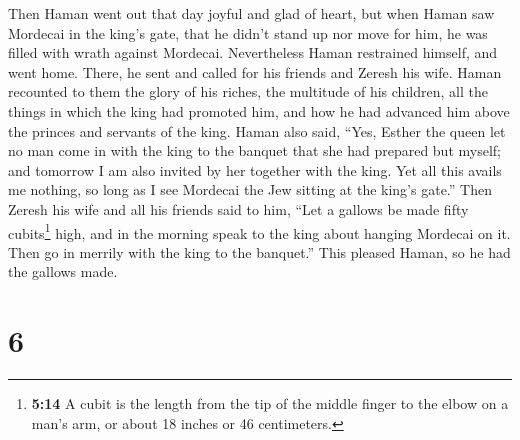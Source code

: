  Then Haman went out that day joyful and glad of heart,
but when Haman saw Mordecai in the king's gate, that he didn't stand up
nor move for him, he was filled with wrath against Mordecai.
 Nevertheless Haman restrained himself, and went home.
There, he sent and called for his friends and Zeresh his wife.
 Haman recounted to them the glory of his riches, the
multitude of his children, all the things in which the king had promoted
him, and how he had advanced him above the princes and servants of the
king.  Haman also said, ``Yes, Esther the queen let no
man come in with the king to the banquet that she had prepared but
myself; and tomorrow I am also invited by her together with the king.
 Yet all this avails me nothing, so long as I see
Mordecai the Jew sitting at the king's gate.''  Then
Zeresh his wife and all his friends said to him, ``Let a gallows be made
fifty cubits\footnote{\textbf{5:14} A cubit is the length from the tip
  of the middle finger to the elbow on a man's arm, or about 18 inches
  or 46 centimeters.} high, and in the morning speak to the king about
hanging Mordecai on it. Then go in merrily with the king to the
banquet.'' This pleased Haman, so he had the gallows made.

\hypertarget{section-5}{%
\section{6}\label{section-5}}

